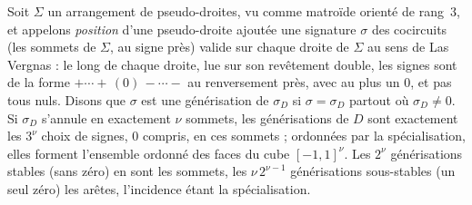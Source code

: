 \begin{encadre}
\begin{theoreme*}
Soit $\Sigma$ un arrangement de pseudo-droites, vu comme matroïde orienté de rang~$3$, et appelons \emph{position} d'une pseudo-droite ajoutée une signature $\sigma$ des cocircuits (les sommets de $\Sigma$, au signe près) valide sur chaque droite de $\Sigma$ au sens de Las Vergnas : le long de chaque droite, lue sur son revêtement double, les signes sont de la forme $+ \cdots + \,(0)\, - \cdots -$ au renversement près, avec au plus un $0$, et pas tous nuls. Disons que $\sigma$ est une générisation de $\sigma_D$ si $\sigma = \sigma_D$ partout où $\sigma_D \neq 0$. Si $\sigma_D$ s'annule en exactement $\nu$ sommets, les générisations de $D$ sont exactement les $3^\nu$ choix de signes, $0$ compris, en ces sommets ; ordonnées par la spécialisation, elles forment l'ensemble ordonné des faces du cube $[-1, 1]^\nu$. Les $2^\nu$ générisations stables (sans zéro) en sont les sommets, les $\nu\,2^{\nu-1}$ générisations sous-stables (un seul zéro) les arêtes, l'incidence étant la spécialisation.
\end{theoreme*}
\end{encadre}
